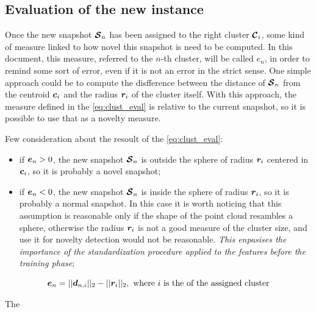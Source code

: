 \subsection{Evaluation of the new instance}
Once the new snapshot $\bm{\mathcal{S}}_n$ has been assigned to the right cluster $\bm{\mathcal{C}}_i$, some kind of measure linked to how novel this snapshot is need to be computed. In this document, this measure, referred to the $n$-th cluster, will be called $e_n$, in order to remind some sort of error, even if it is not an error in the strict sense. One simple approach could be to compute the disfference between the distance of $\bm{\mathcal{S}}_n$ from the centroid $\bm{c}_i$ and the radius $\bm{r}_i$ of the cluster itself. With this approach, the measure defined in the \autoref{eq:clust_eval} is relative to the current snapshot, so it is possible to use that as a novelty measure.

Few consideration about the resoult of the \autoref{eq:clust_eval}:
\begin{itemize}
  \item if $\bm{e}_{n} > 0$, the new snapshot $\bm{\mathcal{S}}_n$ is outside the sphere of radius $\bm{r}_i$ centered in $\bm{c}_i$, so it is probably a novel snapshot;
  \item if $\bm{e}_{n} < 0$, the new snapshot $\bm{\mathcal{S}}_n$ is inside the sphere of radius $\bm{r}_i$, so it is probably a normal snapshot. In this case it is worth noticing that this assumption is reasonable only if the shape of the point cloud resambles a sphere, otherwise the radius $\bm{r}_i$ is not a good measure of the cluster size, and use it for novelty detection would not be reasonable. \emph{This enpasises the importance of the standardization procedure applied to the features before the training phase};
\end{itemize}

\begin{equation}
  \label{eq:clust_eval}
  \bm{e}_{n} = ||\bm{d}_{n,i}||_2 - ||\bm{r}_{i}||_2, \text{ where $i$ is the of the assigned cluster}
\end{equation}

The 
